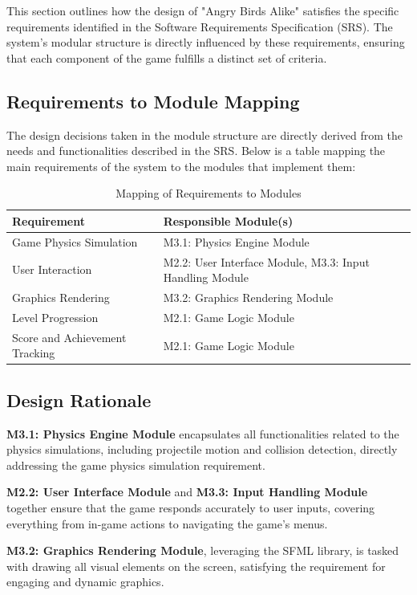 \documentclass[12pt]{article}
\begin{document}
This section outlines how the design of "Angry Birds Alike" satisfies the specific requirements identified in the Software Requirements Specification (SRS). The system's modular structure is directly influenced by these requirements, ensuring that each component of the game fulfills a distinct set of criteria.

\subsection{Requirements to Module Mapping}

The design decisions taken in the module structure are directly derived from the needs and functionalities described in the SRS. Below is a table mapping the main requirements of the system to the modules that implement them:

\begin{table}[H]
\centering
\begin{tabular}{|l|l|}
\hline
\textbf{Requirement} & \textbf{Responsible Module(s)} \\
\hline
Game Physics Simulation & M3.1: Physics Engine Module \\
User Interaction & M2.2: User Interface Module, M3.3: Input Handling Module \\
Graphics Rendering & M3.2: Graphics Rendering Module \\
Level Progression & M2.1: Game Logic Module \\
Score and Achievement Tracking & M2.1: Game Logic Module \\
\hline
\end{tabular}
\caption{Mapping of Requirements to Modules}
\label{tab:requirements-to-modules}
\end{table}

\subsection{Design Rationale}

\textbf{M3.1: Physics Engine Module} encapsulates all functionalities related to the physics simulations, including projectile motion and collision detection, directly addressing the game physics simulation requirement.

\textbf{M2.2: User Interface Module} and \textbf{M3.3: Input Handling Module} together ensure that the game responds accurately to user inputs, covering everything from in-game actions to navigating the game's menus.

\textbf{M3.2: Graphics Rendering Module}, leveraging the SFML library, is tasked with drawing all visual elements on the screen, satisfying the requirement for engaging and dynamic graphics.
\end{document}

